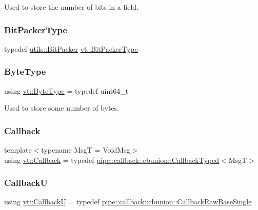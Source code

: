 Used to store the number of bits in a field. 

\mbox{\label{namespacevt_a80d5091925c65efd88ca7f49fe1d633b}} 
\subsubsection{\texorpdfstring{Bit\+Packer\+Type}{BitPackerType}}
{\footnotesize\ttfamily typedef \hyperlink{structvt_1_1utils_1_1_bit_packer}{utils\+::\+Bit\+Packer} \hyperlink{namespacevt_a80d5091925c65efd88ca7f49fe1d633b}{vt\+::\+Bit\+Packer\+Type}}

\mbox{\label{namespacevt_aab8d55968084610ce3b17057981e9300}} 
\subsubsection{\texorpdfstring{Byte\+Type}{ByteType}}
{\footnotesize\ttfamily using \hyperlink{namespacevt_aab8d55968084610ce3b17057981e9300}{vt\+::\+Byte\+Type} = typedef uint64\+\_\+t}



Used to store some number of bytes. 

\mbox{\label{namespacevt_a36db99df4c973d48b1118a293fff533f}} 
\subsubsection{\texorpdfstring{Callback}{Callback}}
{\footnotesize\ttfamily template$<$typename MsgT  = Void\+Msg$>$ \\
using \hyperlink{namespacevt_a36db99df4c973d48b1118a293fff533f}{vt\+::\+Callback} = typedef \hyperlink{structvt_1_1pipe_1_1callback_1_1cbunion_1_1_callback_typed}{pipe\+::callback\+::cbunion\+::\+Callback\+Typed}$<$MsgT$>$}

\mbox{\label{namespacevt_af79a43a97bc3593fc349f086c874c48e}} 
\subsubsection{\texorpdfstring{CallbackU}{CallbackU}}
{\footnotesize\ttfamily using \hyperlink{namespacevt_af79a43a97bc3593fc349f086c874c48e}{vt\+::\+CallbackU} = typedef \hyperlink{structvt_1_1pipe_1_1callback_1_1cbunion_1_1_callback_raw_base_single}{pipe\+::callback\+::cbunion\+::\+Callback\+Raw\+Base\+Single}}

